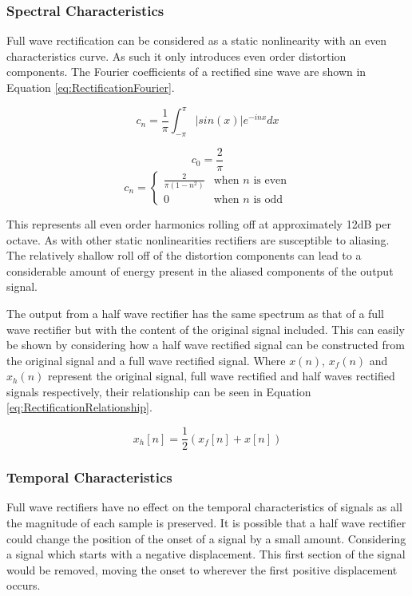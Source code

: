 		\subsubsection*{Spectral Characteristics}
			Full wave rectification can be considered as a static nonlinearity with an even characteristics
			curve. As such it only introduces even order distortion components. The Fourier coefficients of a
			rectified sine wave are shown in Equation \ref{eq:RectificationFourier}.

			\[ c_{n} = \frac{1}{\pi} \int_{-\pi}^{\pi} |sin(x)|e^{-inx} dx \]

			\[ c_{0} = \frac{2}{\pi} \]
			\begin{equation}
				c_{n} = \begin{cases}
					\frac{2}{\pi(1 - n^{2})} & \text{when $n$ is even} \\
					0 & \text{when $n$ is odd}
				\end{cases}
				\label{eq:RectificationFourier}
			\end{equation}

			This represents all even order harmonics rolling off at approximately 12dB per octave.  As with
			other static nonlinearities rectifiers are susceptible to aliasing. The relatively shallow roll off
			of the distortion components can lead to a considerable amount of energy present in the aliased
			components of the output signal. 

			The output from a half wave rectifier has the same spectrum as that of a full wave rectifier
			but with the content of the original signal included. This can easily be shown by considering how a
			half wave rectified signal can be constructed from the original signal and a full wave rectified
			signal. Where $x(n)$, $x_{f}(n)$ and $x_{h}(n)$ represent the original signal, full wave rectified
			and half waves rectified signals respectively, their relationship can be seen in Equation
			\ref{eq:RectificationRelationship}.

			\begin{equation}
				x_{h}[n] = \frac{1}{2} \left( x_{f}[n] + x[n] \right)
				\label{eq:RectificationRelationship}
			\end{equation}

		\subsubsection*{Temporal Characteristics}
			Full wave rectifiers have no effect on the temporal characteristics of signals as all the magnitude
			of each sample is preserved. It is possible that a half wave rectifier could change the position of
			the onset of a signal by a small amount. Considering a signal which starts with a negative
			displacement. This first section of the signal would be removed, moving the onset to wherever the
			first positive displacement occurs.
			
